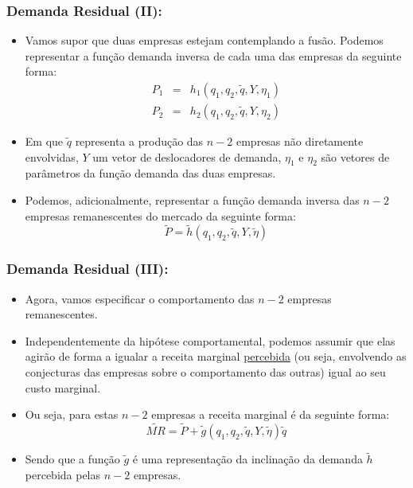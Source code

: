\documentclass{beamer}
\begin{document}
\begin{frame}\frametitle{Demanda Residual (II):}

\begin{itemize}
\item Vamos supor que duas empresas estejam contemplando a fusão. Podemos
representar a função demanda inversa de cada uma das empresas da seguinte
forma:
\begin{eqnarray*}
P_{1} & = & h_{1}(q_{1},q_{2},\tilde{q},Y,\eta_{1})\\
P_{2} & = & h_{2}(q_{1},q_{2},\tilde{q},Y,\eta_{2})
\end{eqnarray*}

\item Em que $\tilde{q}$ representa a produção das $n-2$ empresas não
diretamente envolvidas, $Y$ um vetor de deslocadores de demanda,
$\eta_{1}$ e $\eta_{2}$ são vetores de parâmetros da função demanda
das duas empresas.
\item Podemos, adicionalmente, representar a função demanda inversa das
$n-2$ empresas remanescentes do mercado da seguinte forma:
\[
\tilde{P}=\tilde{h}(q_{1},q_{2},\tilde{q},Y,\tilde{\eta})
\]

\end{itemize}
\end{frame}

\begin{frame}\frametitle{Demanda Residual (III):}

\begin{itemize}
\item Agora, vamos especificar o comportamento das $n-2$ empresas remanescentes. 
\item Independentemente da hipótese comportamental, podemos assumir que
elas agirão de forma a igualar a receita marginal \uline{percebida}
(ou seja, envolvendo as conjecturas das empresas sobre o comportamento
das outras) igual ao seu custo marginal. 
\item Ou seja, para estas $n-2$ empresas a receita marginal é da seguinte
forma:
\[
\tilde{MR}=\tilde{P}+\tilde{g}(q_{1},q_{2},\tilde{q},Y,\tilde{\eta})\tilde{q}
\]

\item Sendo que a função $\tilde{g}$ é uma representação da inclinação
da demanda $\tilde{h}$ percebida pelas $n-2$ empresas. 
\end{itemize}
\end{frame}
\end{document}
